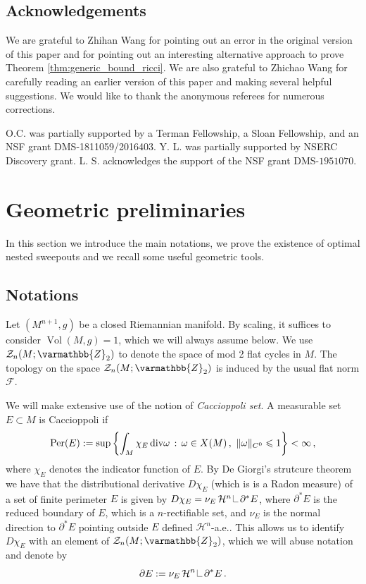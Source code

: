 \documentclass[12pt,twoside]{amsart}
\numberwithin{equation}{section}
\renewcommand{\leq}{\leqslant}
\renewcommand{\mathbb}{\varmathbb}
\newcommand{\cF}{\mathcal F}
\renewcommand{\cH}{\mathcal H}
\DeclareMathOperator{\Per}{Per}
\DeclareMathOperator{\Vol}{Vol}
\newcommand\res{\mathop{\hbox{\vrule height 7pt width .3pt depth 0pt
\vrule height .3pt width 5pt depth 0pt}}\nolimits}
\begin{document}
\subsection{Acknowledgements} We are grateful to Zhihan Wang for pointing out an error in the original version of this paper and for pointing out an interesting alternative approach to prove Theorem \ref{thm:generic_bound_ricci}.
We are also grateful to Zhichao Wang for carefully reading an earlier version of this paper and making several helpful suggestions.
We would like to thank the anonymous referees for numerous corrections. 

O.C. was partially supported by a Terman Fellowship, a Sloan Fellowship, and an
NSF grant DMS-1811059/2016403. Y. L. was partially supported by NSERC Discovery grant. L. S. acknowledges the support of the NSF grant DMS-$1951070$.  

\section{Geometric preliminaries}
 
In this section we introduce the main notations, we prove the existence of optimal nested sweepouts and we recall some useful geometric tools.

\subsection{Notations} Let $(M^{n+1},g)$ be a closed Riemannian manifold. By scaling, it suffices to consider $\Vol(M,g) = 1$, which we will always assume below. We use $\mathcal{Z}_{n}(M; \mathbb{Z}_2)$ to denote
the space of mod 2 flat cycles in $M$. The topology on the space $\mathcal{Z}_{n}(M; \mathbb{Z}_2)$ is induced by the usual flat norm $\cF$.

We will make extensive use of the notion of \emph{Caccioppoli set}. A measurable set $E\subset M$ is Caccioppoli if 
\[
\Per(E):=\sup\left\{ \int_M \chi_E\,{\rm div} \omega\,:\, \omega\in X(M)\,,\,\,\|\omega\|_{C^0}\leq 1  \right\}<\infty\,,
\]
where $\chi_E$ denotes the indicator function of $E$. By De Giorgi's strutcure theorem we have that the distributional derivative $D\chi_E$ (which is is a Radon measure) of a set of finite perimeter $E$ is given by $D\chi_E=\nu_E\, \cH^{n}\res \partial^* E$, where $\partial^* E$ is the reduced boundary of $E$, which is a $n$-rectifiable set, and $\nu_E$ is the normal direction to $\partial^*E$ pointing outside $E$ defined $\cH^{n}$-a.e.. This allows us to identify $D\chi_E$ with an element of $\mathcal{Z}_{n}(M; \mathbb{Z}_2)$, which we will abuse notation and denote by
\[
\partial E := \nu_E\, \cH^{n}\res \partial^* E\,.
\]
\end{document}
